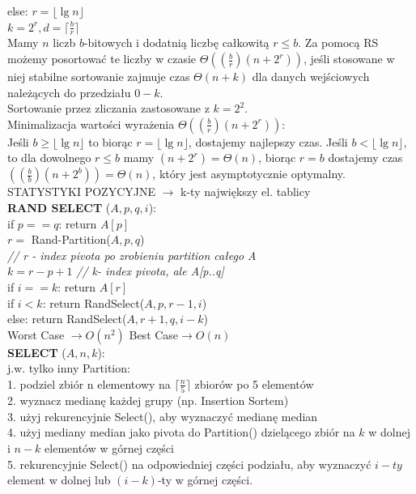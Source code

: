 \documentclass[8pt,a3paper]{article}
\begin{document}
\begin{multicols*}{3}
	else: ${r =\lfloor \lg n \rfloor} $ \\
	$k=2^{r}, d = \lceil \frac{b}{r} \rceil $\\
	Mamy $n$ liczb $b$-bitowych i dodatnią liczbę całkowitą $r \leq b$. Za pomocą RS możemy posortować te liczby w czasie $\Theta((\frac{b}{r})(n+2^{r}))$, jeśli stosowane w niej stabilne sortowanie zajmuje czas $\Theta(n+k)$ dla danych wejściowych należących do przedziału $0-k$.\\
	Sortowanie przez zliczania zastosowane z $k=2^{2}$. \\
	Minimalizacja wartości wyrażenia  $\Theta((\frac{b}{r})(n+2^{r}))$: \\
	Jeśli $b \geq \lfloor \lg n \rfloor$ to biorąc $r=\lfloor \lg n \rfloor$, dostajemy najlepszy czas. Jeśli $b < \lfloor \lg n \rfloor$, to dla dowolnego $r \leq b$ mamy $(n+2^{r}) = \Theta(n)$, biorąc $r=b$ dostajemy czas $((\frac{b}{b})(n+2^{b})) = \Theta(n)$, który jest asymptotycznie optymalny. \\
	STATYSTYKI POZYCYJNE $\to$ k-ty największy el. tablicy \\
	\textbf{RAND SELECT} ($A,p,q,i$): \\
	if $p==q$: return $A[p]$ \\
	$r =$ Rand-Partition($A,p,q$) \\ \textit{// r - index pivota po zrobieniu partition całego A} \\
	$k= r - p+1$ \textit{// k- index pivota, ale A[p..q]} \\
	if $i==k$: return $A[r]$\\
	if $i<k$: return RandSelect($A,p,r-1,i$)\\
	else: return RandSelect($A,r+1,q,i-k$)\\
	Worst Case $\to O(n^{2})$ \qquad Best Case$\to O(n)$\\
	\textbf{SELECT} ($A,n,k$): \\
	j.w. tylko inny Partition: \\
	1. podziel zbiór n elementowy na $\lceil \frac{n}{5} \rceil$ zbiorów po 5 elementów \\
	2. wyznacz medianę każdej grupy (np. Insertion Sortem) \\
	3. użyj rekurencyjnie Select(), aby wyznaczyć medianę median \\
	4. użyj mediany median jako pivota do Partition() dzielącego zbiór na $k$ w dolnej i $n-k$ elementów w górnej części \\
	5. rekurencyjnie Select() na odpowiedniej części podziału, aby wyznaczyć $i-ty$ element w dolnej lub $(i-k)$-ty w górnej części. \\

\end{multicols*}
\end{document}
